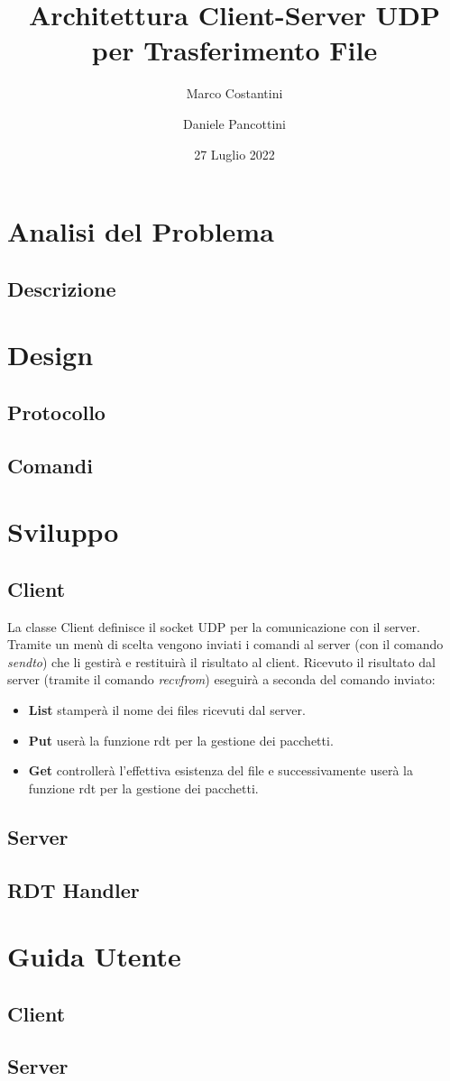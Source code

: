 \documentclass{article}
\title{Architettura Client-Server UDP per Trasferimento File}
\author{Marco Costantini \and Daniele Pancottini}
\date{27 Luglio 2022}
\begin{document}
\maketitle
\newpage

\tableofcontents

\newpage
\section{Analisi del Problema}
\subsection{Descrizione}

\newpage
\section{Design}
\subsection{Protocollo}
\subsection{Comandi}

\newpage
\section{Sviluppo}
\subsection{Client}
La classe Client definisce il socket UDP per la comunicazione con il server.
Tramite un menù di scelta vengono inviati i comandi al server (con il comando  \textit{sendto}) che li gestirà e restituirà il risultato al client.
Ricevuto il risultato dal server (tramite il comando \textit{recvfrom}) eseguirà a seconda del comando inviato:
\begin{itemize}
    \item \textbf{List} stamperà il nome dei files ricevuti dal server.
    \item \textbf{Put} userà la funzione rdt per la gestione dei pacchetti.
    \item \textbf{Get} controllerà l'effettiva esistenza del file e successivamente userà la funzione rdt per la gestione dei pacchetti.
\end{itemize}

\subsection{Server}
\subsection{RDT Handler}

\newpage
\section{Guida Utente}
\subsection{Client}
\subsection{Server}

\end{document}
